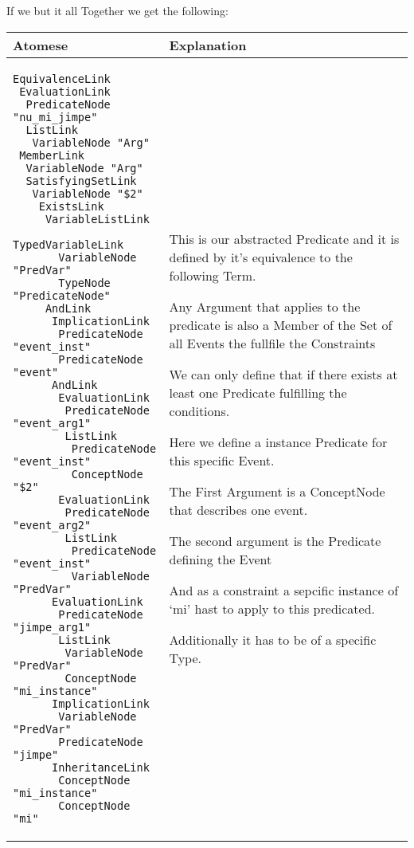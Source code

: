 If we but it all Together we get the following:
\begin{center}
    \begin{tabular}{| p{8cm} | p{6cm} |}
        \hline
        Atomese & Explanation \\
        \hline
        \begin{lstlisting}
EquivalenceLink
 EvaluationLink
  PredicateNode "nu_mi_jimpe"
  ListLink
   VariableNode "Arg"
 MemberLink
  VariableNode "Arg"
  SatisfyingSetLink
   VariableNode "$2"
    ExistsLink
     VariableListLink
      TypedVariableLink
       VariableNode "PredVar"
       TypeNode "PredicateNode"
     AndLink
      ImplicationLink
       PredicateNode "event_inst"
       PredicateNode "event"
      AndLink
       EvaluationLink
        PredicateNode "event_arg1"
        ListLink
         PredicateNode "event_inst"
         ConceptNode "$2"
       EvaluationLink
        PredicateNode "event_arg2"
        ListLink
         PredicateNode "event_inst"
         VariableNode "PredVar"
      EvaluationLink
       PredicateNode "jimpe_arg1"
       ListLink
        VariableNode "PredVar"
        ConceptNode "mi_instance"
      ImplicationLink
       VariableNode "PredVar"
       PredicateNode "jimpe"
      InheritanceLink
       ConceptNode "mi_instance"
       ConceptNode "mi"
        \end{lstlisting}
        &
        \begin{center}
This is our abstracted Predicate and it is defined by it’s equivalence to the following Term. \newline

Any Argument that applies to the predicate is also a Member of the Set of all Events the fullfile the Constraints \newline

We can only define that if there exists at least one Predicate fulfilling the conditions. \newline \newline \newline

Here we define a instance Predicate for this specific Event. \newline \newline

The First Argument is a ConceptNode that describes one event. \newline \newline

The second argument is the Predicate defining the Event \newline \newline \newline

            And as a constraint a sepcific instance of ‘mi’ hast to apply to this predicated. \newline \newline

Additionally it has to be of a specific Type. \newline
        \end{center}
        \\ \hline
    \end{tabular}
\end{center}

